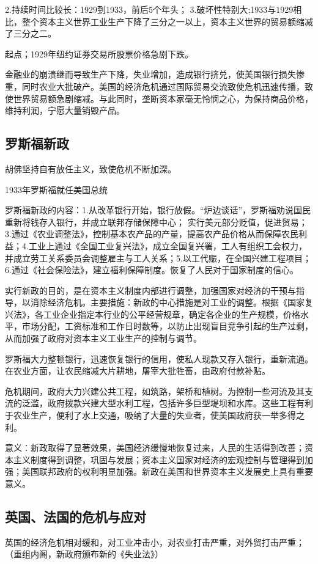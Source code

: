 2.持续时间比较长：1929到1933，前后5个年头；
3.破坏性特别大;1933与1929相比，整个资本主义世界工业生产下降了三分之一以上，资本主义世界的贸易额缩减了三分之二。

起点；1929年纽约证券交易所股票价格急剧下跌。

金融业的崩溃继而导致生产下降，失业增加，造成银行挤兑，使美国银行损失惨重，同时农业大批破产。美国的经济危机通过国际贸易交流致使危机迅速传播，致使世界贸易额急剧缩减。与此同时，垄断资本家毫无怜悯之心，为保持商品价格，维持利润，宁愿大量销毁产品。

\subsection{罗斯福新政}
胡佛坚持自有放任主义，致使危机不断加深。

1933年罗斯福就任美国总统

罗斯福新政的内容：1.从改革银行开始，银行放假。“炉边谈话”，罗斯福劝说国民重新将钱存入银行，并成立联邦存储保障中心；
实行美元部分贬值，促进贸易；3.通过《农业调整法》，控制基本农产品的产量，提高农产品价格从而保障农民利益；4.工业上通过《全国工业复兴法》，成立全国复兴署，工人有组织工会权力，并成立劳工关系委员会调整雇主与工人关系；5.以工代赈，在全国兴建工程项目；6.通过《社会保险法》，建立福利保障制度。恢复了人民对于国家制度的信心。

实行新政的目的，是在资本主义制度内部进行调整，加强国家对经济的干预与指导，以消除经济危机。主要措施：新政的中心措施是对工业的调整。根据《国家复兴法》，各工业企业指定本行业的公平经营规章，确定各企业的生产规模，价格水平，市场分配，工资标准和工作日时数等，以防止出现盲目竞争引起的生产过剩，从而加强了政府对资本主义工业生产的控制与调节。

罗斯福大力整顿银行，迅速恢复银行的信用，使私人现款又存入银行，重新流通。在农业方面，让农民缩减大片耕地，屠宰大批牲畜，由政府付款补贴。

危机期间，政府大力兴建公共工程，如筑路，架桥和植树。为控制一些河流及其支流的泛滥，政府拨款兴建大型水利工程，包括许多巨型堤坝和水库。这些工程有利于农业生产，便利了水上交通，吸纳了大量的失业者，使美国政府获一举多得之利。

意义：新政取得了显著效果，美国经济缓慢地恢复过来，人民的生活得到改善；资本主义制度得到调整，巩固与发展；资本主义国家对经济的宏观控制与管理得到加强；美国联邦政府的权利明显加强。新政在美国和世界资本主义发展史上具有重要意义。

\subsection{英国、法国的危机与应对}
英国的经济危机相对缓和，对工业冲击小，对农业打击严重，对外贸打击严重；（重组内阁，新政府颁布新的《失业法》）

